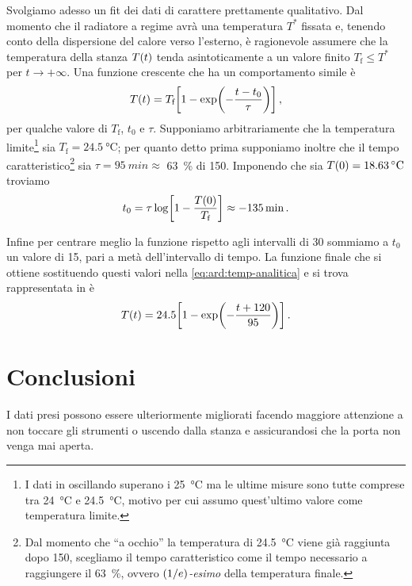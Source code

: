             Svolgiamo adesso un fit dei dati di carattere prettamente qualitativo. Dal momento che il radiatore a regime avrà una temperatura $T^*$ fissata e, tenendo conto della dispersione del calore verso l'esterno, è ragionevole assumere che la temperatura della stanza $T\pqty{t}$ tenda asintoticamente a un valore finito $T_\text{f} \leq T^*$ per $t\to+\infty$. Una funzione crescente che ha un comportamento simile è
            \begin{equation}
                T\pqty{t} = T_\text{f}\bqty{1 - \exp\!\pqty{-\frac{t - t_0}{\tau}}}
                \mycomma
                \label{eq:ard:temp-analitica}
            \end{equation}
            per qualche valore di $T_\text{f}$, $t_0$ e $\tau$. Supponiamo arbitrariamente che la temperatura limite\footnote{I dati in  oscillando superano i \SI{25}{\celsius} ma le ultime misure sono tutte comprese tra \SI{24}{\celsius} e \SI{24.5}{\celsius}, motivo per cui assumo quest'ultimo valore come temperatura limite.} sia $T_\text{f} = \SI{24.5}{\celsius}$; per quanto detto prima supponiamo inoltre che il tempo caratteristico\footnote{Dal momento che ``a occhio'' la temperatura di \SI{24.5}{\celsius} viene già raggiunta dopo \SI{150}{\min}, scegliamo il tempo caratteristico come il tempo necessario a raggiungere il \SI{63}{\%}, ovvero \textit{$\pqty{1/e}$-esimo} della temperatura finale.} sia $\tau = \SI{95}{min} \approx$ \SI{63}{\%} di \SI{150}{\min}. Imponendo che sia $T\pqty{0} = \SI{18.63}{\celsius}$ troviamo
            \begin{equation*}
                t_0
                = \tau \log\!\bqty{1-\frac{T\pqty{0}}{T_\text{f}}}
                \approx -\SI{135}{\min}
                \myperiod
            \end{equation*}

            Infine per centrare meglio la funzione rispetto agli intervalli di \SI{30}{\min} sommiamo a $t_0$ un valore di \SI{15}{\min}, pari a metà dell'intervallo di tempo. La funzione finale che si ottiene sostituendo questi valori nella \eqref{eq:ard:temp-analitica} e si trova rappresentata in  è
            \begin{equation}
                T\pqty{t} =  24.5 \bqty{1 - \exp\!\pqty{-\frac{t + 120}{95}}}
                \myperiod
                \label{eq:ard:temp-numerica}
            \end{equation}

    \section{Conclusioni}
        I dati presi possono essere ulteriormente migliorati facendo maggiore attenzione a non toccare gli strumenti o uscendo dalla stanza e assicurandosi che la porta non venga mai aperta.

